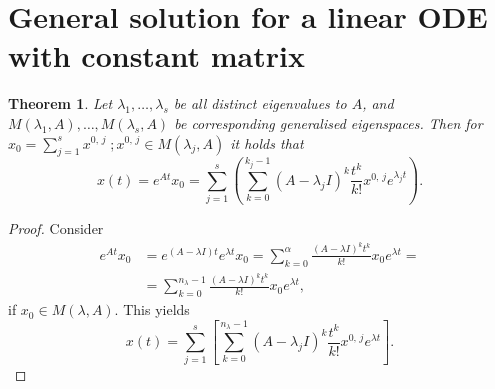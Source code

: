 \documentclass[12pt, a4paper]{article}
\newtheorem{theorem}{Theorem}[section]
\begin{document}
\section{General solution for a linear ODE with constant matrix}
\begin{theorem}
Let $\lambda_1,\dots,\lambda_s$ be all distinct eigenvalues to $A$, and $M(\lambda_1,A),\dots,M(\lambda_s,A)$ be corresponding generalised eigenspaces. Then for $x_0 = \sum_{j=1}^s x^{0,\,j}\; ; x^{0,\,j}\in M(\lambda_j, A)$ it holds that
\begin{equation*}
x(t) = e^{At}x_0 = \sum_{j=1}^s\left( \sum_{k=0}^{k_j-1} (A-\lambda_j I)^k \frac{t^k}{k!}x^{0,\,j}e^{\lambda_j t}\right).
\end{equation*}
\end{theorem}
\begin{proof}
Consider 
\begin{equation*}
\begin{split}
e^{At}x_0 &= e^{(A-\lambda I)t}e^{\lambda t}x_0 = \sum_{k=0}^\alpha \frac{(A-\lambda I)^k t^k}{k!}x_0 e^{\lambda t} = \\
& = \sum_{k=0}^{n_\lambda -1} \frac{(A-\lambda I)^k t^k}{k!}x_0 e^{\lambda t},
\end{split}
\end{equation*}
if $x_0 \in M(\lambda,A)$. This yields
\begin{equation*}
x(t) = \sum_{j=1}^s\left[ \sum_{k=0}^{n_\lambda-1}(A-\lambda_j I)^k \frac{t^k}{k!} x^{0,\,j}e^{\lambda t} \right].
\end{equation*}
\end{proof}
\end{document}

